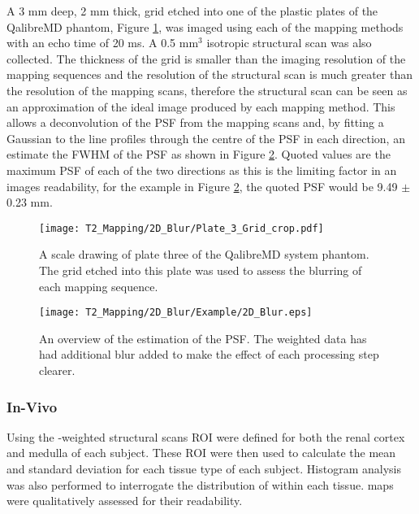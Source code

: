 A 3 mm deep, 2 mm thick, grid etched into one of the plastic plates of the QalibreMD phantom, Figure \ref{fig:t2_blur_grid}, was imaged using each of the \ttwo mapping methods with an echo time of 20 ms. A 0.5 mm$^3$ isotropic structural scan was also collected. The thickness of the grid is smaller than the imaging resolution of the \ttwo mapping sequences and the resolution of the structural scan is much greater than the resolution of the \ttwo mapping scans, therefore the structural scan can be seen as an approximation of the ideal image produced by each \ttwo mapping method. This allows a deconvolution of the \ac{PSF} from the \ttwo mapping scans and, by fitting a Gaussian to the line profiles through the centre of the \ac{PSF} in each direction, an estimate the \ac{FWHM} of the \ac{PSF} as shown in Figure \ref{fig:t2_2d_blur}. Quoted values are the maximum \ac{PSF} of each of the two directions as this is the limiting factor in an images readability, for the example in Figure \ref{fig:t2_2d_blur}, the quoted \ac{PSF} would be 9.49 $\pm$ 0.23 mm.

\begin{figure}[H]
	\centering
	\texttt{[image: T2\_Mapping/2D\_Blur/Plate\_3\_Grid\_crop.pdf]}
	\caption{A scale drawing of plate three of the QalibreMD system phantom. The grid etched into this plate was used to assess the blurring of each \ttwo mapping sequence.}
	\label{fig:t2_blur_grid}	
\end{figure}

\begin{figure}[H]
	\centering
	\texttt{[image: T2\_Mapping/2D\_Blur/Example/2D\_Blur.eps]}
	\caption{An overview of the estimation of the \ac{PSF}. The \ttwo weighted data has had additional blur added to make the effect of each processing step clearer.}
	\label{fig:t2_2d_blur}	
\end{figure}

\subsubsection{In-Vivo}

Using the \tone-weighted structural scans \ac{ROI} were defined for both the renal cortex and medulla of each subject. These \ac{ROI} were then used to calculate the mean and standard deviation \ttwo for each tissue type of each subject. Histogram analysis was also performed to interrogate the distribution of \ttwo within each tissue. \ttwo maps were qualitatively assessed for their readability.

